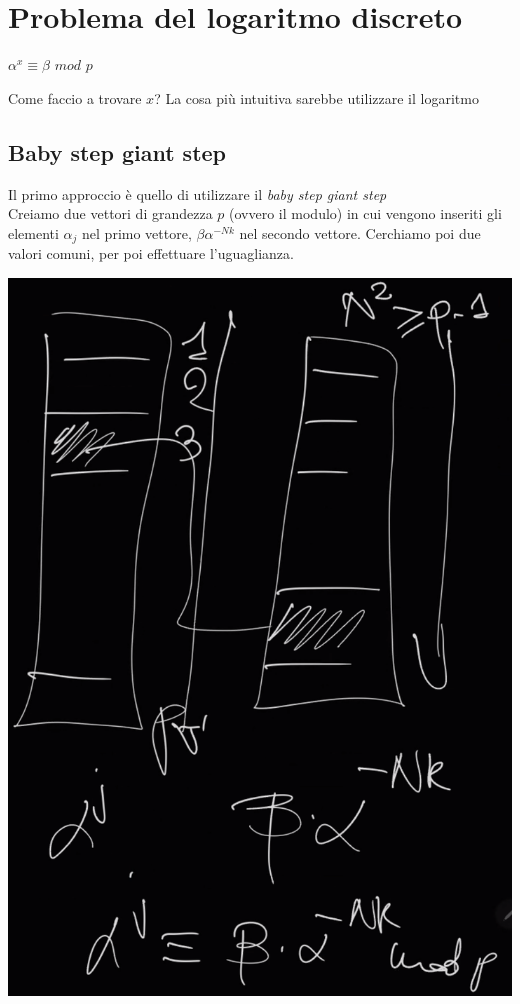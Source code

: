 \documentclass[11pt, oneside]{article}   	%
\begin{document}
\section*{Problema del logaritmo discreto}

\begin{center}
$\alpha^x \equiv \beta$ $mod$ $p$
\end{center}
Come faccio a trovare $x$? La cosa più intuitiva sarebbe utilizzare il logaritmo
\subsection*{Baby step giant step}
Il primo approccio è quello di utilizzare il \emph{baby step giant step}\\
Creiamo due vettori di grandezza $p$ (ovvero il modulo) in cui vengono inseriti gli elementi $\alpha_j$ nel primo vettore, $\beta\alpha^{-Nk}$ nel secondo vettore. Cerchiamo poi due valori comuni, per poi effettuare l'uguaglianza. 
\begin{center}
\includegraphics[scale= 0.4]{rev1}
\end{center}
\end{document}
